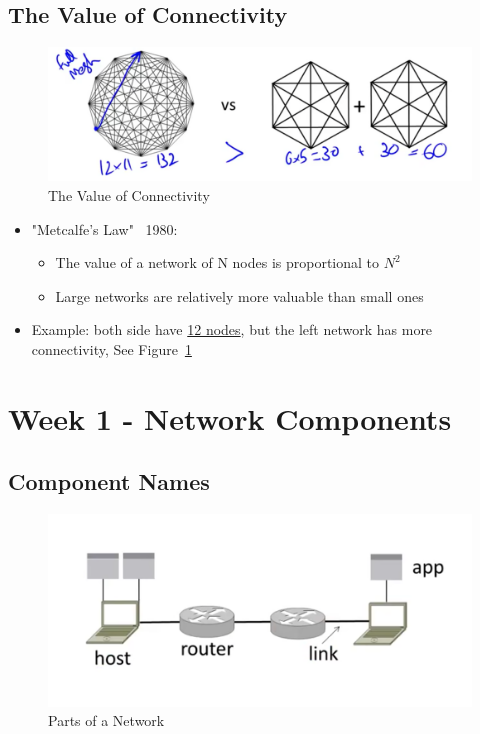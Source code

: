 \documentclass[12pt]{ctexart}   %
\begin{document}
	\subsection{The Value of Connectivity}
	
	\begin{figure}[h!] %
	 \centering
	 \includegraphics[scale=0.5]{images/1-2-4}
	\caption{ The Value of Connectivity }
	 \label{fig:1-2-4}
	 \end{figure}	
	
	\begin{itemize}
		\item "Metcalfe's Law" ~1980:
		\begin{itemize}
			\item The value of a network of N nodes is proportional to $N^2$
			\item Large networks are relatively more valuable than small ones
		\end{itemize}
		
		\item Example: both side have \underline{12 nodes}, but the left network has more connectivity, See Figure~\ref{fig:1-2-4}
	\end{itemize}
	
\section{Week 1 - Network Components}
	\subsection{Component Names}
	
	\begin{figure}[h!] %
	 \centering
	 \includegraphics[scale=1.0]{images/1-3-1}
	\caption{ Parts of a Network }
	 \label{fig:1-3-1}
	 \end{figure}
	 
\end{document}
